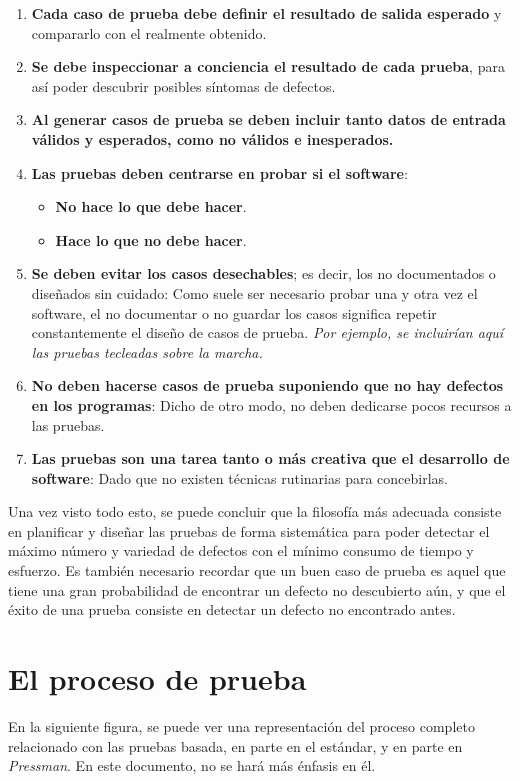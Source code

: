 \begin{enumerate}
    \item \textbf{Cada caso de prueba debe definir el resultado de salida esperado} y compararlo con el realmente obtenido.
    \item \textbf{Se debe inspeccionar a conciencia el resultado de cada prueba}, para así poder descubrir posibles síntomas de defectos.
    \item \textbf{Al generar casos de prueba se deben incluir tanto datos de entrada válidos y esperados, como no válidos e inesperados.}
    \item \textbf{Las pruebas deben centrarse en probar si el software}:
          \begin{itemize}
              \item \textbf{No hace lo que debe hacer}.
              \item \textbf{Hace lo que no debe hacer}.
          \end{itemize}
    \item \textbf{Se deben evitar los casos desechables}; es decir, los no documentados o diseñados sin cuidado: Como suele ser necesario probar una y otra vez el software, el no documentar o no guardar los casos significa repetir constantemente el diseño de casos de prueba. \textit{Por ejemplo, se incluirían aquí las pruebas tecleadas sobre la marcha.}
    \item \textbf{No deben hacerse casos de prueba suponiendo que no hay defectos en los programas}: Dicho de otro modo, no deben dedicarse pocos recursos a las pruebas.
    \item \textbf{Las pruebas son una tarea tanto o más creativa que el desarrollo de software}: Dado que no existen técnicas rutinarias para concebirlas.
\end{enumerate}

Una vez visto todo esto, se puede concluir que la filosofía más adecuada consiste en planificar y diseñar las pruebas de forma sistemática para poder detectar el máximo número y variedad de defectos con el mínimo consumo de tiempo y esfuerzo. Es también necesario recordar que un buen caso de prueba es aquel que tiene una gran probabilidad de encontrar un defecto no descubierto aún, y que el éxito de una prueba consiste en detectar un defecto no encontrado antes.


\section{El proceso de prueba}

En la siguiente figura, se puede ver una representación del proceso completo relacionado con las pruebas basada, en parte en el estándar, y en parte en \textit{Pressman}. En este documento, no se hará más énfasis en él.

